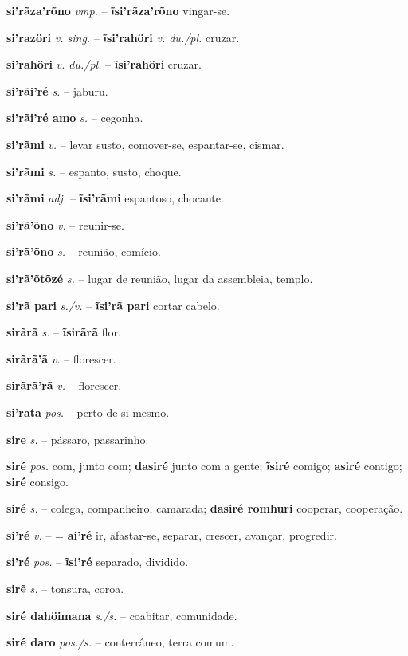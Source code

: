 \textbf{si'rãza'rõno} \textit{vmp.} -- \textbf{ĩsi'rãza'rõno} vingar-se.

\textbf{si'razöri} \textit{v. sing.} -- \textbf{ĩsi'rahöri} \textit{v. du./pl.} cruzar.

\textbf{si'rahöri} \textit{v. du./pl.} -- \textbf{ĩsi'rahöri} cruzar.

\textbf{si'rãi'ré} \textit{s.} -- jaburu.

\textbf{si'rãi'ré amo} \textit{s.} -- cegonha.

\textbf{si'rãmi} \textit{v.} -- levar susto, comover-se, espantar-se, cismar.

\textbf{si'rãmi} \textit{s.} -- espanto, susto, choque.

\textbf{si'rãmi} \textit{adj.} -- \textbf{ĩsi'rãmi} espantoso, chocante.

\textbf{si'rã'õno} \textit{v.} -- reunir-se.

\textbf{si'rã'õno} \textit{s.} -- reunião, comício.

\textbf{si'rã'õtõzé} \textit{s.} -- lugar de reunião, lugar da assembleia, templo.

\textbf{si'rã pari} \textit{s./v.} -- \textbf{ĩsi'rã pari} cortar cabelo.

\textbf{sirãrã} \textit{s.} -- \textbf{ĩsirãrã} flor.

\textbf{sirãrã'ã} \textit{v.} -- florescer.

\textbf{sirãrã'rã} \textit{v.} -- florescer.

\textbf{si'rata} \textit{pos.} -- perto de si mesmo.

\textbf{sire} \textit{s.} -- pássaro, passarinho.

\textbf{siré} \textit{pos.} com, junto com; \textbf{dasiré} junto com a gente; \textbf{ĩsiré} comigo; \textbf{asiré} contigo; \textbf{siré} consigo.

\textbf{siré} \textit{s.} -- colega, companheiro, camarada; \textbf{dasiré romhuri} cooperar, cooperação.

\textbf{si'ré} \textit{v.} -- = \textbf{ai'ré} ir, afastar-se, separar, crescer, avançar, progredir.

\textbf{si'ré} \textit{pos.} -- \textbf{ĩsi'ré} separado, dividido.

\textbf{sirẽ} \textit{s.} -- tonsura, coroa.

\textbf{siré dahöimana} \textit{s./s.} -- coabitar, comunidade.

\textbf{siré daro} \textit{pos./s.} -- conterrâneo, terra comum.

